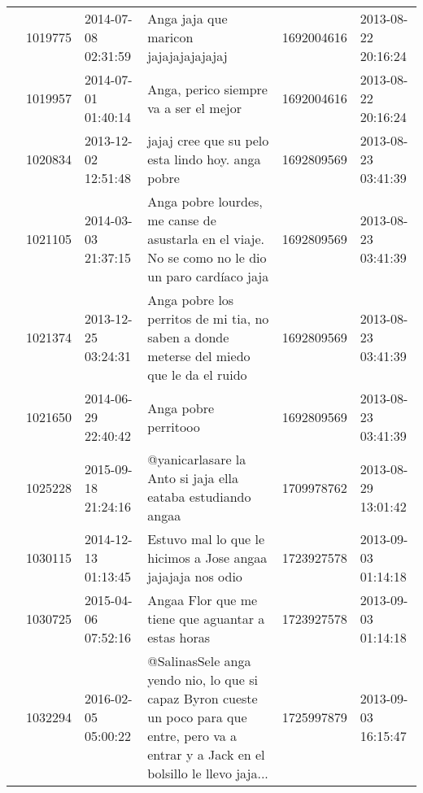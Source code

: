 \begin{tabular}{llllrl}
           & 1019775 & 2014-07-08 02:31:59 &                                                                                                        Anga jaja que maricon jajajajajajajaj &  1692004616 & 2013-08-22 20:16:24 \\
           & 1019957 & 2014-07-01 01:40:14 &                                                                                                       Anga, perico siempre va a ser el mejor &  1692004616 & 2013-08-22 20:16:24 \\
           & 1020834 & 2013-12-02 12:51:48 &                                                                                            jajaj cree que su pelo esta lindo hoy. anga pobre &  1692809569 & 2013-08-23 03:41:39 \\
           & 1021105 & 2014-03-03 21:37:15 &                                            Anga pobre lourdes, me canse de asustarla en el viaje. No se como no le dio un paro cardíaco jaja &  1692809569 & 2013-08-23 03:41:39 \\
           & 1021374 & 2013-12-25 03:24:31 &                                                     Anga pobre los perritos de mi tia, no saben a donde meterse del miedo que le da el ruido &  1692809569 & 2013-08-23 03:41:39 \\
           & 1021650 & 2014-06-29 22:40:42 &                                                                                                                         Anga pobre perritooo &  1692809569 & 2013-08-23 03:41:39 \\
           & 1025228 & 2015-09-18 21:24:16 &                                                                                 @yanicarlasare  la Anto si jaja ella eataba estudiando angaa &  1709978762 & 2013-08-29 13:01:42 \\
           & 1030115 & 2014-12-13 01:13:45 &                                                                                  Estuvo mal lo que le hicimos a Jose angaa jajajaja nos odio &  1723927578 & 2013-09-03 01:14:18 \\
           & 1030725 & 2015-04-06 07:52:16 &                                                                                           Angaa Flor que me tiene que aguantar a estas horas &  1723927578 & 2013-09-03 01:14:18 \\
           & 1032294 & 2016-02-05 05:00:22 &  @SalinasSele anga yendo nio, lo que si capaz Byron cueste un poco para que entre, pero va a entrar y a Jack en el bolsillo le llevo jaja... &  1725997879 & 2013-09-03 16:15:47 \\

\end{tabular}
